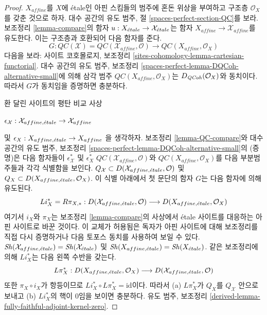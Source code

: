 \begin{proof}
$X_{affine}$를 $X$에 \'etale인 아핀 스킴들의 범주에 혼돈 위상을
부여하고 구조층 $\mathcal{O}_X$를 갖춘 것으로 하자. 대수 공간의 유도 범주,
절 \ref{spaces-perfect-section-QC}를 보라.
보조정리 \ref{lemma-compare}의 함자
$u : X_{\acute{e}tale} \to \mathcal{X}_{\acute{e}tale}$는 함자
$X_{affine} \to \mathcal{X}_{affine}$를 유도한다.
이는 구조층과 호환되어 다음 함자를 준다.
$$
G :
\mathit{QC}(\mathcal{X}) = \mathit{QC}(\mathcal{X}_{affine}, \mathcal{O})
\longrightarrow
\mathit{QC}(X_{affine}, \mathcal{O}_X)
$$
다음을 보라: 사이트 코호몰로지, 보조정리
\ref{sites-cohomology-lemma-cartesian-functorial}.
대수 공간의 유도 범주, 보조정리
\ref{spaces-perfect-lemma-DQCoh-alternative-small}에 의해 삼각 범주
$\mathit{QC}(X_{affine}, \mathcal{O}_X)$는
$D_{\mathit{QCoh}}(\mathcal{O}_X)$와 동치이다. 따라서 $G$가 동치임을
증명하면 충분하다.

\medskip\noindent
환 달린 사이트의 평탄 비교 사상\par\noindent
$\epsilon_\mathcal{X} : \mathcal{X}_{affine, {\acute{e}tale}} \to \mathcal{X}_{affine}$\par\noindent
및 $\epsilon_X : X_{affine, {\acute{e}tale}} \to X_{affine}$
을 생각하자. 보조정리 \ref{lemma-QC-compare}와 대수 공간의 유도 범주,
보조정리 \ref{spaces-perfect-lemma-DQCoh-alternative-small}의 (증명)은
다음 함자들이
$\epsilon_\mathcal{X}^*$ 및 $\epsilon_X^*$
 $\mathit{QC}(\mathcal{X}_{affine}, \mathcal{O})$와
$\mathit{QC}(X_{affine}, \mathcal{O}_X)$를 다음 부분범주들과
각각 식별함을 보인다.
$Q_\mathcal{X} \subset D(\mathcal{X}_{affine, {\acute{e}tale}}, \mathcal{O})$
및
$Q_X \subset D(X_{affine, {\acute{e}tale}}, \mathcal{O}_X)$.
이 식별 아래에서 첫 문단의 함자 $G$는 다음 함자에 의해 유도된다.
$$
Li_X^* = R\pi_{X, *}:
D(\mathcal{X}_{affine, {\acute{e}tale}}, \mathcal{O})
\longrightarrow
D(X_{affine, {\acute{e}tale}}, \mathcal{O}_X)
$$
여기서 $i_X$와 $\pi_X$는 보조정리 \ref{lemma-compare}의 사상에서
\'etale 사이트를 대응하는 아핀 사이트로 바꾼 것이다. 이 교체가
허용됨은 독자가 아핀 사이트에 대해 보조정리를 직접 다시 증명하거나
다음 토포스 동치를 사용하여 보일 수 있다.
$\mathop{\mathit{Sh}}\nolimits(\mathcal{X}_{affine, {\acute{e}tale}}) = \mathop{\mathit{Sh}}\nolimits(\mathcal{X}_{\acute{e}tale})$ 및
$\mathop{\mathit{Sh}}\nolimits(X_{affine, {\acute{e}tale}}) = \mathop{\mathit{Sh}}\nolimits(X_{\acute{e}tale})$.
같은 보조정리에 의해 $Li_X^*$는 다음 왼쪽 수반을 갖는다.
$$
L\pi_X^*:
D(X_{affine, {\acute{e}tale}}, \mathcal{O}_X)
\longrightarrow
D(\mathcal{X}_{affine, {\acute{e}tale}}, \mathcal{O})
$$
또한 $\pi_X \circ i_X$가 항등이므로
$Li_X^* \circ L\pi_X^* = \text{id}$이다. 따라서 (a) $L\pi_X^*$가
$Q_X$를 $Q_\mathcal{X}$ 안으로 보내고 (b) $Li_X^*$의 핵이 $0$임을
보이면 충분하다. 유도 범주, 보조정리
\ref{derived-lemma-fully-faithful-adjoint-kernel-zero}.


\end{proof}
